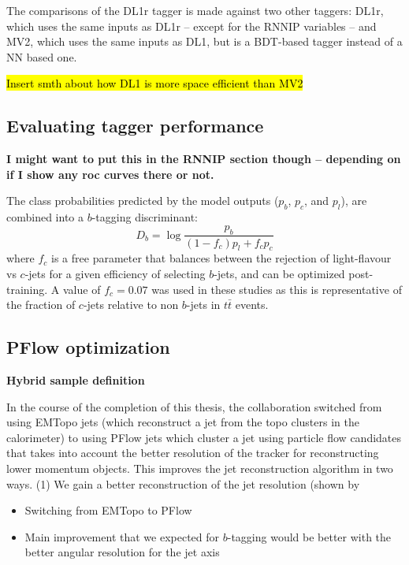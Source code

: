 The comparisons of the DL1r tagger is made against two other taggers: DL1r, which uses the same inputs as DL1r -- except for the RNNIP variables -- and MV2, which uses the same inputs as DL1, but is a BDT-based tagger instead of a NN based one.


\hl{Insert smth about how DL1 is more space efficient than MV2}


\subsection{Evaluating tagger performance}

\textbf{I might want to put this in the RNNIP section though -- depending on if I show any roc curves there or not.}

The class probabilities predicted by the model outputs ($p_b$, $p_c$, and $p_l$), are combined into a $b$-tagging discriminant:
\begin{equation}
 D_b = \log \frac{p_b}{(1-f_c) p_l + f_c p_c}
 \label{eq:dipsdiscriminant}
\end{equation}
where $f_c$ is a free parameter that balances between the rejection of light-flavour vs $c$-jets for a given efficiency of selecting $b$-jets, and can be optimized post-training. 
A value of $f_c = 0.07$ was used in these studies  as this is representative of the fraction of $c$-jets relative to non $b$-jets in $t\bar{t}$ events. 


\subsection{PFlow optimization}

\textbf{Hybrid sample definition}

In the course of the completion of this thesis, the collaboration switched from using EMTopo jets (which reconstruct a jet from the topo clusters in the calorimeter) to  using PFlow jets which cluster a jet using particle flow candidates that takes into account the better resolution of the tracker for reconstructing lower momentum objects. This improves the jet reconstruction algorithm in two ways. (1) We gain a better reconstruction of the jet \pt resolution (shown by 

\begin{itemize}
	\item Switching from EMTopo to PFlow
	\item Main improvement that we expected for $b$-tagging would be better with the better angular resolution for the jet axis
\end{itemize}


